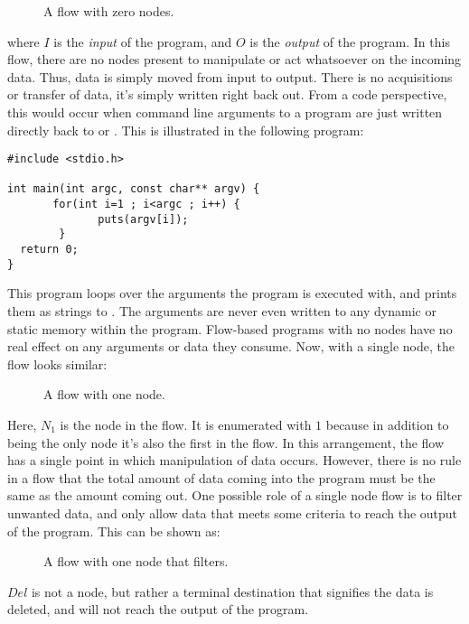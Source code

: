 \begin{figure}[h]
\centering
{}
\caption{A flow with zero nodes.}
\end{figure}

where $I$ is the \emph{input} of the program, and $O$ is the \emph{output} of the program. In this flow, there are no nodes present to manipulate or act whatsoever on the incoming data. Thus, data is simply moved from input to output. There is no acquisitions or transfer of data, it's simply written right back out. From a code perspective, this would occur when command line arguments to a program are just written directly back to  or . This is illustrated in the following program:

\begin{lstlisting}[style=numc]
#include <stdio.h>

int main(int argc, const char** argv) {
       for(int i=1 ; i<argc ; i++) {
              puts(argv[i]);
        }
  return 0;
}
\end{lstlisting}

\par This program loops over the arguments the program is executed with, and prints them as strings to . The arguments are never even written to any dynamic or static memory within the program. Flow-based programs with no nodes have no real effect on any arguments or data they consume. Now, with a single node, the flow looks similar:

\begin{figure}[h]
\centering
{}
\caption{A flow with one node.}
\end{figure}

\par Here, $N_1$ is the node in the flow. It is enumerated with $1$ because in addition to being the only node it's also the first in the flow. In this arrangement, the flow has a single point in which manipulation of data occurs. However, there is no rule in a flow that the total amount of data coming into the program must be the same as the amount coming out. One possible role of a single node flow is to filter unwanted data, and only allow data that meets some criteria to reach the output of the program. This can be shown as:

\begin{figure}[h]
\centering
{}
\caption{A flow with one node that filters.}
\end{figure}

\par $Del$ is not a node, but rather a terminal destination that signifies the data is deleted, and will not reach the output of the program. 

